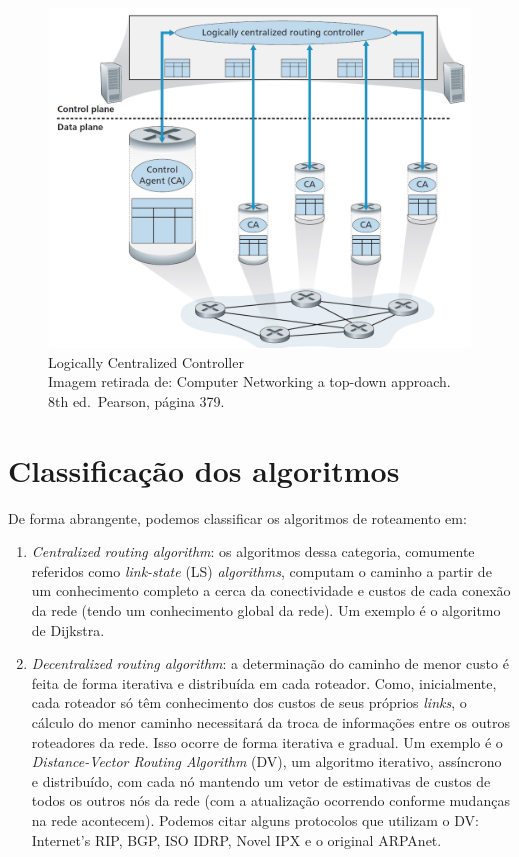 \begin{figure}[h!]
\centering
\includegraphics[keepaspectratio, width=12cm, height=9cm]{imagens/14/14 - Logically centralized controller.png}
\caption{Logically Centralized Controller \\
Imagem retirada de: Computer Networking a top-down approach. 8th
ed.~Pearson, página 379. \\}
\label{fig:Logically Centralized Controller}
\end{figure}




\hypertarget{Classificação dos algoritmos}{%
\section{Classificação dos algoritmos}\label{Classificação dos algoritmos}}

De forma abrangente, podemos classificar os algoritmos de roteamento em:

\begin{enumerate}
\def\labelenumi{\arabic{enumi}.}
\item
  \emph{Centralized routing algorithm}: os algoritmos dessa categoria,
  comumente referidos como \emph{link-state} (LS) \emph{algorithms},
  computam o caminho a partir de um conhecimento completo a cerca da
  conectividade e custos de cada conexão da rede (tendo um conhecimento
  global da rede). Um exemplo é o algoritmo de Dijkstra.
\item
  \emph{Decentralized routing algorithm}: a determinação do caminho de
  menor custo é feita de forma iterativa e distribuída em cada roteador.
  Como, inicialmente, cada roteador só têm conhecimento dos custos de
  seus próprios \emph{links}, o cálculo do menor caminho necessitará da
  troca de informações entre os outros roteadores da rede. Isso ocorre
  de forma iterativa e gradual. Um exemplo é o \emph{Distance-Vector
  Routing Algorithm} (DV), um algoritmo iterativo, assíncrono e
  distribuído, com cada nó mantendo um vetor de estimativas de custos de
  todos os outros nós da rede (com a atualização ocorrendo conforme
  mudanças na rede acontecem). Podemos citar alguns protocolos que
  utilizam o DV: Internet's RIP, BGP, ISO IDRP, Novel IPX e o original
  ARPAnet.
\end{enumerate}

